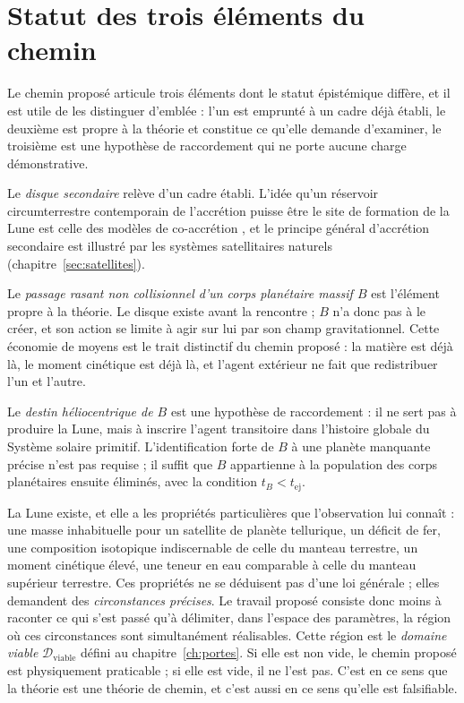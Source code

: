 \documentclass[11pt,a4paper,openany]{report}
\begin{document}
\section{Statut des trois éléments du chemin}

Le chemin proposé articule trois éléments dont le statut épistémique diffère, et il est utile de
les distinguer d'emblée : l'un est emprunté à un cadre déjà établi, le deuxième est propre à la
théorie et constitue ce qu'elle demande d'examiner, le troisième est une hypothèse de raccordement
qui ne porte aucune charge démonstrative.

Le \emph{disque secondaire} relève d'un cadre établi. L'idée qu'un réservoir circumterrestre
contemporain de l'accrétion puisse être le site de formation de la Lune est celle des modèles de
co-accrétion \cite{Ruskol1960,Weidenschilling1986}, et le principe général d'accrétion secondaire
est illustré par les systèmes satellitaires naturels (chapitre~\ref{sec:satellites}).

Le \emph{passage rasant non collisionnel d'un corps planétaire massif $B$} est l'élément propre à
la théorie. Le disque existe avant la rencontre ; $B$ n'a donc pas à le créer, et son action se
limite à agir sur lui par son champ gravitationnel. Cette économie de moyens est le trait
distinctif du chemin proposé : la matière est déjà là, le moment cinétique est déjà là, et l'agent
extérieur ne fait que redistribuer l'un et l'autre.

Le \emph{destin héliocentrique de $B$} est une hypothèse de raccordement : il ne sert pas à produire
la Lune, mais à inscrire l'agent transitoire dans l'histoire globale du Système solaire primitif.
L'identification forte de $B$ à une planète manquante précise n'est pas requise ; il suffit que $B$
appartienne à la population des corps planétaires ensuite éliminés, avec la condition
$ t_B<t_{\mathrm{ej}} $.

\begin{ideephys}
La Lune existe, et elle a les propriétés particulières que l'observation lui connaît : une masse
inhabituelle pour un satellite de planète tellurique, un déficit de fer, une composition isotopique
indiscernable de celle du manteau terrestre, un moment cinétique élevé, une teneur en eau
comparable à celle du manteau supérieur terrestre. Ces propriétés ne se déduisent pas d'une loi
générale ; elles demandent des \emph{circonstances précises}. Le travail proposé consiste donc
moins à raconter ce qui s'est passé qu'à délimiter, dans l'espace des paramètres, la région où ces
circonstances sont simultanément réalisables. Cette région est le \emph{domaine viable}
$\mathcal{D}_{\mathrm{viable}}$ défini au chapitre~\ref{ch:portes}. Si elle est non vide, le chemin
proposé est physiquement praticable ; si elle est vide, il ne l'est pas. C'est en ce sens que la
théorie est une théorie de chemin, et c'est aussi en ce sens qu'elle est falsifiable.
\end{ideephys}
\end{document}
